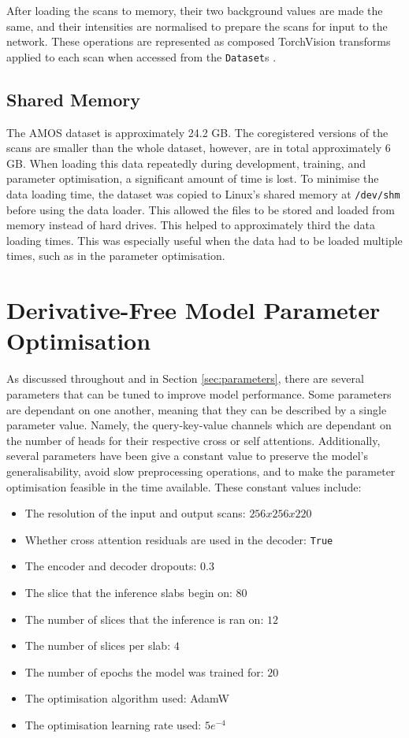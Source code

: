 \documentclass{l4proj}
\begin{document}
After loading the scans to memory, their two background values are made the same, and their intensities are normalised to prepare the scans for input to the network. These operations are represented as composed TorchVision transforms applied to each scan when accessed from the \lstinline{Dataset}s \citep{TorchVision_maintainers_and_contributors_TorchVision_PyTorch_s_Computer_2016}.

\subsection{Shared Memory}

The AMOS dataset is approximately 24.2 GB. The coregistered versions of the scans are smaller than the whole dataset, however, are in total approximately 6 GB. When loading this data repeatedly during development, training, and parameter optimisation, a significant amount of time is lost. To minimise the data loading time, the dataset was copied to Linux’s shared memory at \lstinline{/dev/shm} before using the data loader. This allowed the files to be stored and loaded from memory instead of hard drives. This helped to approximately third the data loading times. This was especially useful when the data had to be loaded multiple times, such as in the parameter optimisation.

\section{Derivative-Free Model Parameter Optimisation} \label{sec:parameter_optimisation}

As discussed throughout and in Section \ref{sec:parameters}, there are several parameters that can be tuned to improve model performance. Some parameters are dependant on one another, meaning that they can be described by a single parameter value. Namely, the query-key-value channels which are dependant on the number of heads for their respective cross or self attentions. Additionally, several parameters have been give a constant value to preserve the model’s generalisability, avoid slow preprocessing operations, and to make the parameter optimisation feasible in the time available. These constant values include:

\begin{itemize}
    \item{The resolution of the input and output scans: $256x256x220$}
    \item{Whether cross attention residuals are used in the decoder: \lstinline{True}}
    \item{The encoder and decoder dropouts: $0.3$}
    \item{The slice that the inference slabs begin on: $80$}
    \item{The number of slices that the inference is ran on: $12$}
    \item{The number of slices per slab: $4$}
    \item{The number of epochs the model was trained for: $20$}
    \item{The optimisation algorithm used: AdamW}
    \item{The optimisation learning rate used: $5e^{-4}$}
\end{itemize}
\end{document}
